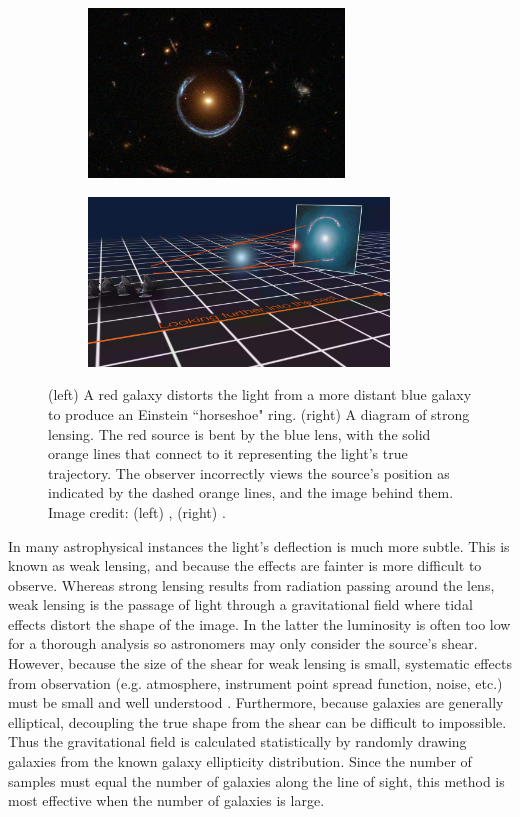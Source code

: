 \begin{figure}
 \centering
 \begin{subfigure}[t]{0.5\textwidth}
  \centering
  \includegraphics[trim={0cm, 2cm, 0cm, 0cm}, clip, height=4.5cm]{lensing_horseshoe}
 \end{subfigure}%
 \begin{subfigure}[t]{0.5\textwidth}
  \centering
  \includegraphics[trim={6cm, 0cm, 0cm, 0cm}, clip, height=4.5cm]{lensing_diagram}
 \end{subfigure}
 \caption{(left) A red galaxy distorts the light from a more distant blue galaxy to produce an Einstein ``horseshoe" ring.  (right)
 A diagram of strong lensing.  The red source is bent by the blue lens, with the solid orange lines that connect
 to it representing the light's true trajectory.  The observer incorrectly views the source's
 position as indicated by the dashed orange lines, and the image behind them.  Image credit: (left) , (right)
 .}
 \label{fig:lensing}
\end{figure}


In many astrophysical instances the light's deflection is much more subtle.  This is known as weak
lensing, and because the effects are fainter is more difficult to observe.  Whereas strong lensing results from radiation passing around
the lens, weak lensing is the passage of light through a gravitational field where tidal effects distort the shape of the image.  In the
latter the luminosity is often too low for a thorough analysis so
astronomers may only consider the source's shear.  However, because the size of the shear for weak lensing is small, systematic
effects from observation (e.g. atmosphere, instrument point spread function, noise, etc.) must be small and well
understood .  Furthermore,
because galaxies are generally elliptical, decoupling the true shape from the shear can be difficult to impossible.  Thus the
gravitational field is calculated statistically by randomly drawing galaxies from the known galaxy ellipticity distribution.  Since the
number of samples must equal the number of galaxies along the line of sight, this method is most effective when the number of galaxies is
large.

